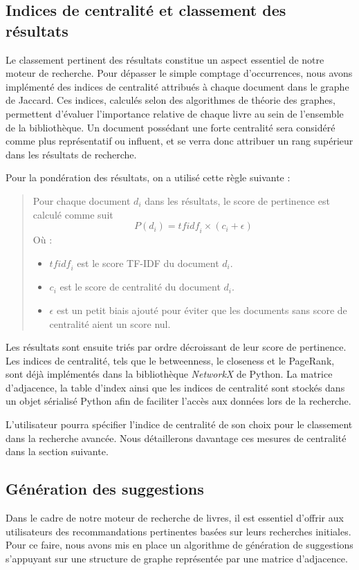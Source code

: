 \documentclass{article}
\begin{document}
    \subsection{Indices de centralité et classement des résultats}
    Le classement pertinent des résultats constitue un aspect essentiel de notre moteur de recherche. Pour dépasser le simple comptage d'occurrences, nous avons implémenté des indices de centralité attribués à chaque document dans le graphe de Jaccard. Ces indices, calculés selon des algorithmes de théorie des graphes, permettent d'évaluer l'importance relative de chaque livre au sein de l'ensemble de la bibliothèque. Un document possédant une forte centralité sera considéré comme plus représentatif ou influent, et se verra donc attribuer un rang supérieur dans les résultats de recherche. 

    Pour la pondération des résultats, on a utilisé cette règle suivante : 
    \begin{quote}
        Pour chaque document $d_i$ dans les résultats, le score de pertinence est calculé comme suit
        \[
            P(d_i) = \textit{tfidf}_i \times \left( c_i + \epsilon \right)
        \]
        Où :
        \begin{itemize}
            \item \( \textit{tfidf}_i \) est le score TF-IDF du document \( d_i \).
            \item \( c_i \) est le score de centralité du document \( d_i \).
            \item \( \epsilon \) est un petit biais ajouté pour éviter que les documents sans score de centralité aient un score nul.
        \end{itemize}
    \end{quote}

    Les résultats sont ensuite triés par ordre décroissant de leur score de pertinence.
    Les indices de centralité, tels que le betweenness, le closeness et le PageRank, sont déjà implémentés dans la bibliothèque  \textit{NetworkX}\cite{networkx} de Python. La matrice d’adjacence, la table d’index ainsi que les indices de centralité sont stockés dans un objet sérialisé Python afin de faciliter l’accès aux données lors de la recherche.

    L’utilisateur pourra spécifier l’indice de centralité de son choix pour le classement dans la recherche avancée. Nous détaillerons davantage ces mesures de centralité dans la section suivante.

    \subsection{Génération des suggestions}
    Dans le cadre de notre moteur de recherche de livres, il est essentiel d’offrir aux utilisateurs des recommandations pertinentes basées sur leurs recherches initiales. Pour ce faire, nous avons mis en place un algorithme de génération de suggestions s’appuyant sur une structure de graphe représentée par une matrice d’adjacence.
    
\end{document}
